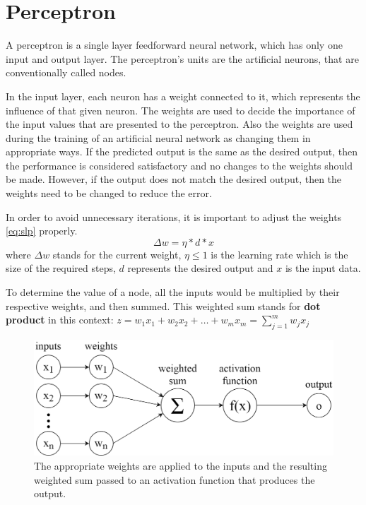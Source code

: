 \section{Perceptron}

A perceptron \cite{tho2010perceptron} is a single layer feedforward neural network, which has only one input and output layer. The perceptron's units are the artificial neurons, that are conventionally called nodes.\smallskip

In the input layer, each neuron has a weight connected to it, which represents the influence of that given neuron. The weights are used to decide the importance of the input values that are presented to the perceptron. Also the weights are used during the training of an artificial neural network as changing them in appropriate ways. If the predicted output is the same as the desired output, then the performance is considered satisfactory and no changes to the weights should be made. However, if the output does not match the desired output, then the weights need to be changed to reduce the error. \medskip

In order to avoid unnecessary iterations, it is important to adjust the weights \eqref{eq:slp} properly.
\begin{equation} \Delta w = \eta * d * x \label{eq:slp} \end{equation} 
where $\Delta w$ stands for the current weight, $\eta \leq 1$ is the learning rate which is the size of the required steps, $d$ represents the desired output and $x$ is the input data. \medskip

To determine the value of a node, all the inputs would be multiplied by their respective weights, and then summed. This weighted sum stands for \textbf{dot product} in this context: $ z = w_1 x_1 + w_2 x_2 + \dots + w_m x_m = \sum_{j=1}^m w_j x_j $

\begin{figure}[h]
	\centering
	\includegraphics[height=0.28\linewidth]{./figures/perceptron}
	\caption{The appropriate weights are applied to the inputs and the resulting weighted sum passed to an activation function that produces the output.}
	\label{fig:perceptron}
\end{figure}

